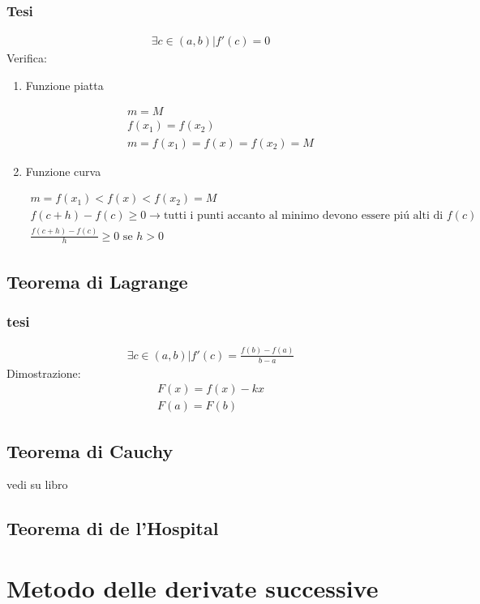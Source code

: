 \documentclass{article}
\begin{document}
\subsubsection{Tesi}
\begin{gather*}
    \exists c \in (a,b) | f'(c)=0
\end{gather*}
Verifica:
\begin{enumerate}
    \item Funzione piatta
    
    \begin{gather*}
        m=M\\
        f(x_1) = f(x_2)\\
        m=f(x_1)=f(x)=f(x_2)=M
    \end{gather*}
    \item  Funzione curva
    
    \begin{gather*}
        m=f(x_1)<f(x)<f(x_2)=M\\
        f(c+h)-f(c)\geq 0\to\text{tutti i punti accanto al minimo devono essere piú alti di } f(c)\\
        \frac{f(c+h)-f(c)}{h} \geq 0\text{ se }h>0
    \end{gather*}
\end{enumerate}
\subsection{Teorema di Lagrange}
\subsubsection{tesi}
\begin{gather*}
    \exists c\in (a,b) | f'(c)=\frac{f(b)-f(a)}{b-a}
\end{gather*}
Dimostrazione:
\begin{gather*}
    F(x)=f(x)-kx\\
    F(a)=F(b)
\end{gather*}
\subsection{Teorema di Cauchy}
vedi su libro
\subsection{Teorema di de l'Hospital}
\section{Metodo delle derivate successive}
\end{document}
